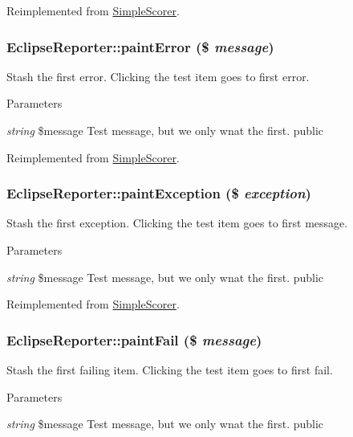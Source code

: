 Reimplemented from \hyperlink{class_simple_scorer_ae66388eacb1a7ef3f99443a942c8a9b1}{SimpleScorer}.\hypertarget{class_eclipse_reporter_a54b5dd27926ce2bed0e1d4886460fe47}{
\subsubsection[{paintError}]{\setlength{\rightskip}{0pt plus 5cm}EclipseReporter::paintError (\$ {\em message})}}
\label{class_eclipse_reporter_a54b5dd27926ce2bed0e1d4886460fe47}
Stash the first error. Clicking the test item goes to first error. 
\begin{DoxyParams}{Parameters}
\item[{\em string}]\$message Test message, but we only wnat the first.  public \end{DoxyParams}


Reimplemented from \hyperlink{class_simple_scorer_ac33eeacd9e121f39874f95eec7219b88}{SimpleScorer}.\hypertarget{class_eclipse_reporter_aebbe55b20bc08df87eb01823113dd7f1}{
\subsubsection[{paintException}]{\setlength{\rightskip}{0pt plus 5cm}EclipseReporter::paintException (\$ {\em exception})}}
\label{class_eclipse_reporter_aebbe55b20bc08df87eb01823113dd7f1}
Stash the first exception. Clicking the test item goes to first message. 
\begin{DoxyParams}{Parameters}
\item[{\em string}]\$message Test message, but we only wnat the first.  public \end{DoxyParams}


Reimplemented from \hyperlink{class_simple_scorer_af85813652ea0ec8aca7261267c121f6c}{SimpleScorer}.\hypertarget{class_eclipse_reporter_a0b040a0e5cb9d9ac50a33e9df8a7cc57}{
\subsubsection[{paintFail}]{\setlength{\rightskip}{0pt plus 5cm}EclipseReporter::paintFail (\$ {\em message})}}
\label{class_eclipse_reporter_a0b040a0e5cb9d9ac50a33e9df8a7cc57}
Stash the first failing item. Clicking the test item goes to first fail. 
\begin{DoxyParams}{Parameters}
\item[{\em string}]\$message Test message, but we only wnat the first.  public \end{DoxyParams}


